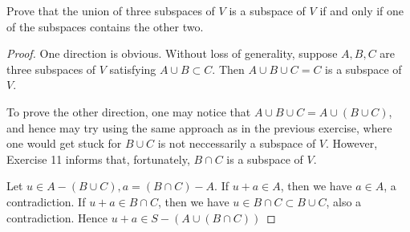 \begin{exercise}{13}
	Prove that the union of three subspaces of \( V \) is a subspace of \( V \) if and only if one of the subspaces contains the other two.

\end{exercise}

\begin{proof}
	One direction is obvious. Without loss of generality, suppose \( A, B, C \) are three subspaces of \( V \) satisfying \( A \cup B \subset C \). Then \( A \cup B \cup C = C \) is a subspace of \( V \).

	To prove the other direction, one may notice that \( A \cup B \cup C = A \cup (B \cup C) \), and hence may try using the same approach as in the previous exercise, where one would get stuck for \( B \cup C \) is not neccessarily a subspace of \( V \). However, Exercise 11 informs that, fortunately, \( B \cap C \) is a subspace of \( V \).

	Let \( u \in A - (B \cup C), a = (B \cap C) - A \). If \( u + a \in A \), then we have \( a \in A \), a contradiction. If \( u + a \in B \cap C \), then we have \( u \in B \cap C \subset B \cup C \), also a contradiction. Hence \( u + a \in S - (A \cup (B \cap C)) \)
\end{proof}

